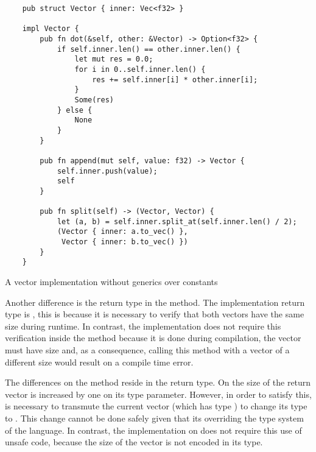 \begin{listing}[H]
    \begin{verbatim}
    pub struct Vector { inner: Vec<f32> }

    impl Vector {
        pub fn dot(&self, other: &Vector) -> Option<f32> {
            if self.inner.len() == other.inner.len() {
                let mut res = 0.0;
                for i in 0..self.inner.len() {
                    res += self.inner[i] * other.inner[i];
                }
                Some(res)
            } else {
                None
            }
        }

        pub fn append(mut self, value: f32) -> Vector {
            self.inner.push(value);
            self
        }

        pub fn split(self) -> (Vector, Vector) {
            let (a, b) = self.inner.split_at(self.inner.len() / 2);
            (Vector { inner: a.to_vec() }, 
             Vector { inner: b.to_vec() })
        }
    }
    \end{verbatim}
    \caption{A vector implementation without generics over constants}
  \label{lst:vector_vanilla}
\end{listing}

Another difference is the return type in the  method. The
 implementation return type is ,
this is because it is necessary to verify that both vectors have the same size
during runtime. In contrast, the  implementation
does not require this verification inside the method because it is done during
compilation, the  vector must have size  and, as a
consequence, calling this method with a vector of a different size would result
on a compile time error.

The differences on the  method reside in the return type. On
 the size of the return vector is increased by one
on its type parameter. However, in order to satisfy this, is necessary to
transmute the current vector (which has type ) to change its
type to . This change cannot be done safely given that its
overriding the type system of the language. In contrast, the implementation on
 does not require this use of unsafe code, because the
size of the vector is not encoded in its type.

